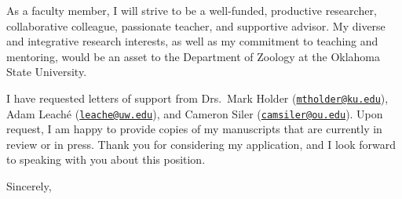 \documentclass[letterpaper, 10pt]{letter}
\begin{document}
\begin{letter}
As a faculty member, I will strive to be a well-funded, productive researcher,
collaborative colleague, passionate teacher, and supportive advisor.
My diverse and integrative research interests, as well as my commitment to
teaching and mentoring, would be an asset to the Department of Zoology at the
Oklahoma State University.

I have requested letters of support from Drs.\
Mark Holder
(\href{mailto:mtholder@ku.edu}{\tt mtholder@ku.edu}),
Adam Leach\'{e}
(\href{mailto:leache@uw.edu}{\tt leache@uw.edu}),
and
Cameron Siler
(\href{mailto:camsiler@ou.edu}{\tt camsiler@ou.edu}).
Upon request, I am happy to provide copies of my manuscripts that are currently
in review or in press.
Thank you for considering my application, and I look forward to speaking with
you about this position.

\addtolength{\medskipamount}{-5pt}
\closing{Sincerely,}
\end{letter}
\end{document}
